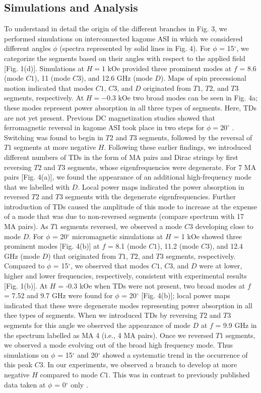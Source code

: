 \documentclass[aps,prl,preprint,showpacs,superscriptaddress,groupedaddress]{revtex4}%
\begin{document}
\subsection{Simulations and Analysis}
To understand in detail the origin of the different branches in Fig. 3, we performed simulations on interconnected kagome ASI in which we considered different angles $\phi$ (spectra represented by solid lines in Fig. 4). For $\phi$ =  15$^{\circ}$, we categorize the segments based on their angles with respect to the applied field [Fig. 1(d)].       Simulations  at $ H = 1$ kOe provided three prominent modes at $f$ = 8.6 (mode $C1$), 11 (mode $C3$), and 12.6 GHz (mode $D$). Maps of spin precessional motion indicated that modes $ C1 $, $ C3 $, and $ D $  originated from $ T1 $, $ T2 $, and $ T3 $ segments, respectively.  At $ H = -0.3$ kOe  two broad modes can be seen in Fig. 4a;  these  modes represent power absorption in all three types of segments. Here, TDs are not yet present. Previous DC magnetization studies showed that  ferromagnetic reversal in kagome ASI took place in two steps for $  \phi = 20 ^{\circ}$ \cite{mellado2010dynamics,daunheimer2011reducing}. Switching was found to begin in $T2$ and $T3$ segments, followed by the reversal of $T1$ segments at more negative $H$. Following these earlier findings, we introduced different numbers of TDs in the form of MA pairs and Dirac strings by first reversing $T2$ and $T3$ segments, whose eigenfrequencies were degenerate. For 7  MA pairs [Fig. 4(a)], we found the appearance of an additional high-frequency mode that we labelled with $D$. Local power maps indicated the power absorption in reversed $T2$ and $T3$ segments with the degenerate eigenfrequencies. Further introduction of TDs caused the amplitude of this mode to increase at the expense of a mode that was due to non-reversed segments (compare spectrum with 17 MA pairs). As  $T1$ segments reversed, we observed a mode $C3$ developing close to mode $D$. For $\phi$ = 20$^{\circ}$ micromagnetic simulations  at $H$ = 1 kOe showed three prominent modes [Fig. 4(b)] at $f$ = 8.1 (mode $C1$), 11.2 (mode $C3$), and 12.4 GHz (mode $D$)  that originated from $T1$, $T2$, and $T3$ segments, respectively. Compared to $\phi$ = 15$^{\circ}$, we observed that modes $C1$, $C3$, and $D$  were at lower, higher and lower frequencies, respectively, consistent with experimental results [Fig. 1(b)]. At $H$ = -0.3 kOe when TDs were not present, two broad modes at $f$ = 7.52 and 9.7 GHz were found for $\phi$ = 20$^{\circ}$ [Fig. 4(b)]; local power maps indicated that these were degenerate modes representing power absorption in all thee types of segments. When we introduced TDs by reversing $T2$ and $T3$ segments for this angle we observed the appearance of mode $D$ at $f$ = 9.9 GHz in the spectrum labelled as MA 4 (i.e., 4 MA pairs). Once we reversed $T1$ segments, we observed a mode evolving out of the broad high frequency mode. Thus simulations on $\phi$ = 15$^{\circ}$ and 20$^{\circ}$  showed a systematic trend in the occurrence of this peak $C3$. In our experiments, we observed a branch to develop at more negative $H$ compared to mode $C1$. This was in contrast to previously published data taken at $\phi$ = 0$^{\circ}$ only \cite{bhat2016magnetization}.
\end{document}
